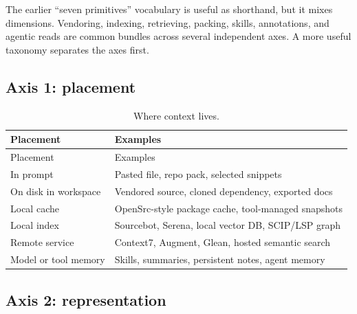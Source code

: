 \documentclass[
  11pt,
  letterpaper,
  numbers=noendperiod,
  parskip=half]{scrartcl}
\begin{document}
The earlier ``seven primitives'' vocabulary is useful as shorthand, but
it mixes dimensions. Vendoring, indexing, retrieving, packing, skills,
annotations, and agentic reads are common bundles across several
independent axes. A more useful taxonomy separates the axes first.

\subsection{Axis 1: placement}\label{sec-axis-placement}

\begin{longtable}[]{@{}
  >{\raggedright\arraybackslash}p{}
  >{\raggedright\arraybackslash}p{}@{}}
\caption{Where context lives.}\label{tbl-placement}\tabularnewline
\toprule\noalign{}
\begin{minipage}[b]{\linewidth}\raggedright
Placement
\end{minipage} & \begin{minipage}[b]{\linewidth}\raggedright
Examples
\end{minipage} \\
\midrule\noalign{}
\endfirsthead
\toprule\noalign{}
\begin{minipage}[b]{\linewidth}\raggedright
Placement
\end{minipage} & \begin{minipage}[b]{\linewidth}\raggedright
Examples
\end{minipage} \\
\midrule\noalign{}
\endhead
\bottomrule\noalign{}
\endlastfoot
In prompt & Pasted file, repo pack, selected snippets \\
On disk in workspace & Vendored source, cloned dependency, exported
docs \\
Local cache & OpenSrc-style package cache, tool-managed snapshots \\
Local index & Sourcebot, Serena, local vector DB, SCIP/LSP graph \\
Remote service & Context7, Augment, Glean, hosted semantic search \\
Model or tool memory & Skills, summaries, persistent notes, agent
memory \\
\end{longtable}

\subsection{Axis 2: representation}\label{sec-axis-representation}
\end{document}
